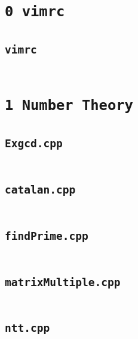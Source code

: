 \section*{\texttt{0 vimrc}} \label{sec:0_0_vimrc}
\subsection*{\texttt{vimrc}} \label{sec:0_0_vimrc_file0}
\inputminted[fontsize=\footnotesize, linenos, breaklines]{cpp}{./0\ vimrc/vimrc}

\section*{\texttt{1 Number Theory}} \label{sec:1_1_Number_Theory}
\subsection*{\texttt{Exgcd.cpp}} \label{sec:1_1_Number_Theory_file0}
\inputminted[fontsize=\footnotesize, linenos, breaklines]{cpp}{./1\ Number\ Theory/Exgcd.cpp}

\subsection*{\texttt{catalan.cpp}} \label{sec:1_1_Number_Theory_file1}
\inputminted[fontsize=\footnotesize, linenos, breaklines]{cpp}{./1\ Number\ Theory/catalan.cpp}

\subsection*{\texttt{findPrime.cpp}} \label{sec:1_1_Number_Theory_file2}
\inputminted[fontsize=\footnotesize, linenos, breaklines]{cpp}{./1\ Number\ Theory/findPrime.cpp}

\subsection*{\texttt{matrixMultiple.cpp}} \label{sec:1_1_Number_Theory_file3}
\inputminted[fontsize=\footnotesize, linenos, breaklines]{cpp}{./1\ Number\ Theory/matrixMultiple.cpp}

\subsection*{\texttt{ntt.cpp}} \label{sec:1_1_Number_Theory_file4}
\inputminted[fontsize=\footnotesize, linenos, breaklines]{cpp}{./1\ Number\ Theory/ntt.cpp}

